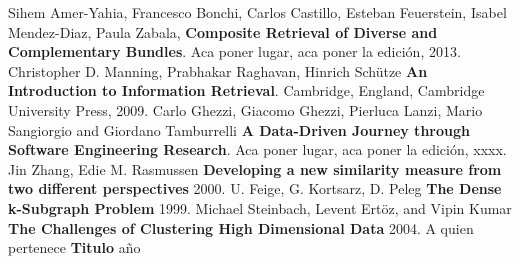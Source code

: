 \begin{thebibliography}{9}
  Sihem Amer-Yahia, Francesco Bonchi, Carlos Castillo,
  Esteban Feuerstein, Isabel Mendez-Diaz, Paula Zabala,
  \textbf{Composite Retrieval of Diverse and Complementary Bundles}.
  Aca poner lugar,
  aca poner la edición,
  2013.
  Christopher D. Manning, Prabhakar Raghavan, Hinrich Schütze
  \textbf{An Introduction to Information Retrieval}.
  Cambridge, England,
  Cambridge University Press,
  2009.
  Carlo Ghezzi, Giacomo Ghezzi, Pierluca Lanzi, Mario Sangiorgio and Giordano Tamburrelli
  \textbf{A Data-Driven Journey through Software Engineering Research}.
  Aca poner lugar,
  aca poner la edición,
  xxxx.
Jin Zhang, Edie M. Rasmussen
\textbf{Developing a new similarity measure from two different perspectives}
2000.
U. Feige, G. Kortsarz, D. Peleg
\textbf{The Dense k-Subgraph Problem}
1999.
Michael Steinbach, Levent Ertöz, and Vipin Kumar
\textbf{The Challenges of Clustering High Dimensional Data}
2004.
A quien pertenece
\textbf{Titulo}
año


\end{thebibliography} 
